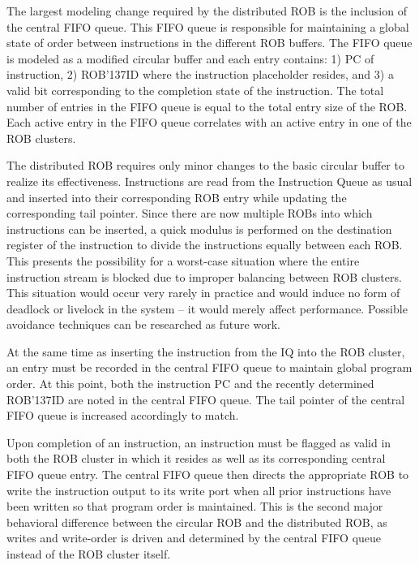 The largest modeling change required by the distributed ROB is the inclusion of the central FIFO queue.  This FIFO queue is responsible for maintaining a global state of order between instructions in the different ROB buffers. The FIFO queue is modeled as a modified circular buffer and each entry contains: 1) PC of instruction, 2) ROB{\char'137}ID where the instruction placeholder resides, and 3) a valid bit corresponding to the completion state of the instruction.  The total number of entries in the FIFO queue is equal to the total entry size of the ROB.  Each active entry in the FIFO queue correlates with an active entry in one of the ROB clusters.

The distributed ROB requires only minor changes to the basic circular buffer to realize its effectiveness.  Instructions are read from the Instruction Queue as usual and inserted into their corresponding ROB entry while updating the corresponding tail pointer.  Since there are now multiple ROBs into which instructions can be inserted, a quick modulus is performed on the destination register of the instruction to divide the instructions equally between each ROB.  This presents the possibility for a worst-case situation where the entire instruction stream is blocked due to improper balancing between ROB clusters.  This situation would occur very rarely in practice and would induce no form of deadlock or livelock in the system -- it would merely affect performance.  Possible avoidance techniques can be researched as future work.

At the same time as inserting the instruction from the IQ into the ROB cluster, an entry must be recorded in the central FIFO queue to maintain global program order.  At this point, both the instruction PC and the recently determined ROB{\char'137}ID are noted in the central FIFO queue.  The tail pointer of the central FIFO queue is increased accordingly to match.

Upon completion of an instruction, an instruction must be flagged as valid in both the ROB cluster in which it resides as well as its corresponding central FIFO queue entry.  The central FIFO queue then directs the appropriate ROB to write the instruction output to its write port when all prior instructions have been written so that program order is maintained.  This is the second major behavioral difference between the circular ROB and the distributed ROB, as writes and write-order is driven and determined by the central FIFO queue instead of the ROB cluster itself.

